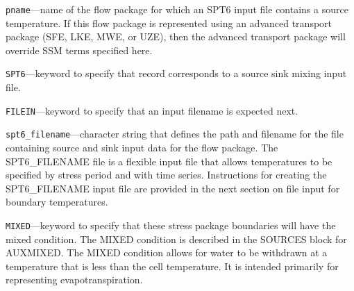 \begin{description}
\item \texttt{pname}---name of the flow package for which an SPT6 input file contains a source temperature.  If this flow package is represented using an advanced transport package (SFE, LKE, MWE, or UZE), then the advanced transport package will override SSM terms specified here.

\item \texttt{SPT6}---keyword to specify that record corresponds to a source sink mixing input file.

\item \texttt{FILEIN}---keyword to specify that an input filename is expected next.

\item \texttt{spt6\_filename}---character string that defines the path and filename for the file containing source and sink input data for the flow package. The SPT6\_FILENAME file is a flexible input file that allows temperatures to be specified by stress period and with time series. Instructions for creating the SPT6\_FILENAME input file are provided in the next section on file input for boundary temperatures.

\item \texttt{MIXED}---keyword to specify that these stress package boundaries will have the mixed condition.  The MIXED condition is described in the SOURCES block for AUXMIXED.  The MIXED condition allows for water to be withdrawn at a temperature that is less than the cell temperature.  It is intended primarily for representing evapotranspiration.

\end{description}

